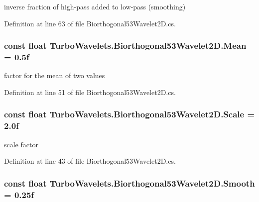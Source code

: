 inverse fraction of high-\/pass added to low-\/pass (smoothing) 



\-Definition at line 63 of file \-Biorthogonal53\-Wavelet2\-D.\-cs.

\hypertarget{class_turbo_wavelets_1_1_biorthogonal53_wavelet2_d_adc5fbcbea59e2154e77c9507cea584e2}{
\subsubsection[{\-Mean}]{\setlength{\rightskip}{0pt plus 5cm}const float {\bf \-Turbo\-Wavelets.\-Biorthogonal53\-Wavelet2\-D.\-Mean} = 0.\-5f}}\label{class_turbo_wavelets_1_1_biorthogonal53_wavelet2_d_adc5fbcbea59e2154e77c9507cea584e2}


factor for the mean of two values 



\-Definition at line 51 of file \-Biorthogonal53\-Wavelet2\-D.\-cs.

\hypertarget{class_turbo_wavelets_1_1_biorthogonal53_wavelet2_d_a18ab552c3e524a02a6115ac6ba9dc9dd}{
\subsubsection[{\-Scale}]{\setlength{\rightskip}{0pt plus 5cm}const float {\bf \-Turbo\-Wavelets.\-Biorthogonal53\-Wavelet2\-D.\-Scale} = 2.\-0f}}\label{class_turbo_wavelets_1_1_biorthogonal53_wavelet2_d_a18ab552c3e524a02a6115ac6ba9dc9dd}


scale factor 



\-Definition at line 43 of file \-Biorthogonal53\-Wavelet2\-D.\-cs.

\hypertarget{class_turbo_wavelets_1_1_biorthogonal53_wavelet2_d_af84189cc1bd640074755c2ce84041c93}{
\subsubsection[{\-Smooth}]{\setlength{\rightskip}{0pt plus 5cm}const float {\bf \-Turbo\-Wavelets.\-Biorthogonal53\-Wavelet2\-D.\-Smooth} = 0.\-25f}}\label{class_turbo_wavelets_1_1_biorthogonal53_wavelet2_d_af84189cc1bd640074755c2ce84041c93}


